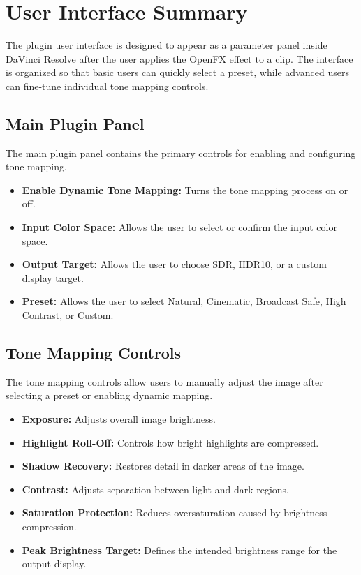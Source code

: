 \documentclass{article}
\begin{document}
\section{User Interface Summary}

The plugin user interface is designed to appear as a parameter panel inside DaVinci Resolve after the user applies the OpenFX effect to a clip. The interface is organized so that basic users can quickly select a preset, while advanced users can fine-tune individual tone mapping controls.

\subsection{Main Plugin Panel}
The main plugin panel contains the primary controls for enabling and configuring tone mapping.

\begin{itemize}
    \item \textbf{Enable Dynamic Tone Mapping:} Turns the tone mapping process on or off.
    \item \textbf{Input Color Space:} Allows the user to select or confirm the input color space.
    \item \textbf{Output Target:} Allows the user to choose SDR, HDR10, or a custom display target.
    \item \textbf{Preset:} Allows the user to select Natural, Cinematic, Broadcast Safe, High Contrast, or Custom.
\end{itemize}

\subsection{Tone Mapping Controls}
The tone mapping controls allow users to manually adjust the image after selecting a preset or enabling dynamic mapping.

\begin{itemize}
    \item \textbf{Exposure:} Adjusts overall image brightness.
    \item \textbf{Highlight Roll-Off:} Controls how bright highlights are compressed.
    \item \textbf{Shadow Recovery:} Restores detail in darker areas of the image.
    \item \textbf{Contrast:} Adjusts separation between light and dark regions.
    \item \textbf{Saturation Protection:} Reduces oversaturation caused by brightness compression.
    \item \textbf{Peak Brightness Target:} Defines the intended brightness range for the output display.
\end{itemize}
\end{document}
